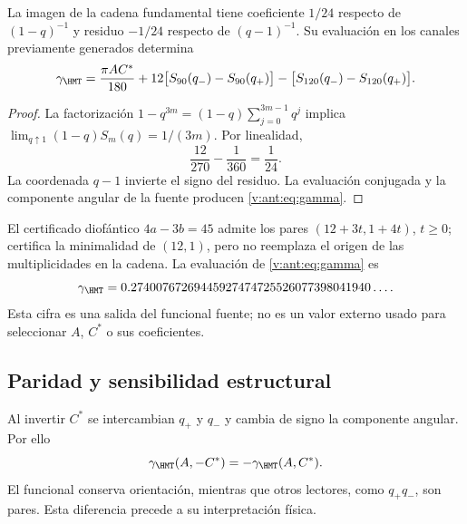 \begin{theorem}
La imagen de la cadena fundamental tiene coeficiente $1/24$
respecto de $(1-q)^{-1}$ y residuo $-1/24$ respecto de $(q-1)^{-1}$.
Su evaluación en los canales previamente generados determina
\begin{equation}
\gamma_{\HMT}=
\frac{\pi AC^*}{180}
+12\bigl[S_{90}(q_-)-S_{90}(q_+)\bigr]
-\bigl[S_{120}(q_-)-S_{120}(q_+)\bigr].
\label{v:ant:eq:gamma}
\end{equation}
\end{theorem}
\begin{proof}
La factorización $1-q^{3m}=(1-q)\sum_{j=0}^{3m-1}q^j$ implica
$\lim_{q\uparrow1}(1-q)S_m(q)=1/(3m)$. Por linealidad,
\[
\frac{12}{270}-\frac1{360}=\frac1{24}.
\]
La coordenada $q-1$ invierte el signo del residuo.
La evaluación conjugada y la componente angular de la fuente
producen \eqref{v:ant:eq:gamma}.
\end{proof}

El certificado diofántico $4a-3b=45$ admite los pares
$(12+3t,1+4t)$, $t\ge0$; certifica la minimalidad de $(12,1)$,
pero no reemplaza el origen de las multiplicidades en la cadena.
La evaluación de \eqref{v:ant:eq:gamma} es
\[
\gamma_{\HMT}
=0.27400767269445927474725526077398041940\ldots.
\]
Esta cifra es una salida del funcional fuente; no es un valor externo
usado para seleccionar $A$, $C^*$ o sus coeficientes.

\subsection{Paridad y sensibilidad estructural}
Al invertir $C^*$ se intercambian $q_+$ y $q_-$ y cambia de signo
la componente angular. Por ello
\[
\gamma_{\HMT}(A,-C^*)=-\gamma_{\HMT}(A,C^*).
\]
El funcional conserva orientación, mientras que otros lectores,
como $q_+q_-$, son pares. Esta diferencia precede a su interpretación física.
